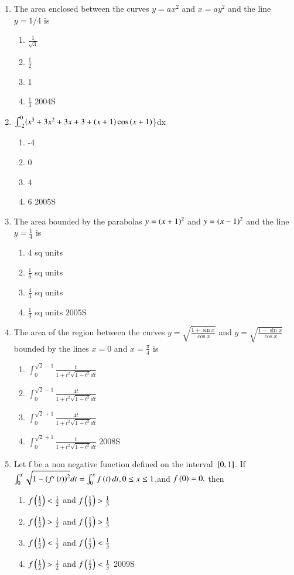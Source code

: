\documentclass[journal,12pt,twocolumn]{IEEEtran}
\theoremstyle{remark}
\begin{document}
\begin{enumerate}
\begin{enumerate}
 \end{enumerate}
 \item The area enclosed between the curves $y=ax^{2}$ and $x=ay^{2}$ and the line $y=1/4$ is
 \begin{enumerate}
	 \item $\frac{1}{\sqrt{3}}$
	 \item $\frac{1}{2}$
     \item 1
     \item $\frac{1}{3}$
     \hfill{{2004S}}
 \end{enumerate}
 \item $\int_{-2}^{0}\{x^{3}+3x^{2}+3x+3+\left(x+1\right)\cos\left(x+1\right)$\}dx
\begin{enumerate}
 \item -4
 \item 0
 \item 4
 \item 6
 \hfill{{2005S}}
\end{enumerate}
  \item The area bounded by the parabolas $y=\left(x+1\right)^2$ and $y=\left(x-1\right)^2$ and the line $y=\frac{1}{4}$ is
\begin{enumerate}
    \item 4 sq units
    \item $\frac{1}{6}$ sq units
    \item $\frac{4}{3}$ sq units
    \item $\frac{1}{3}$ sq units
    \hfill{{2005S}}
\end{enumerate}
 \item The area of the region between the curves $y=\sqrt{\frac{1+\sin x}{\cos x}}$ and $y=\sqrt{\frac{1-\sin x}{\cos x}}$ bounded by the lines $x=0$ and $x=\frac{\pi}{4}$ is
\begin{enumerate}
    \item $\int_{0}^{\sqrt{2}-1}\frac{t}{1+t^{2}\sqrt{1-t^{2}}dt}$
       \item $\int_{0}^{\sqrt{2}-1}\frac{4t}{1+t^{2}\sqrt{1-t^{2}}dt}$
      \item $\int_{0}^{\sqrt{2}+1}\frac{4t}{1+t^{2}\sqrt{1-t^{2}}dt}$ 
         \item $\int_{0}^{\sqrt{2}+1}\frac{t}{1+t^{2}\sqrt{1-t^{2}}dt}$
         \hfill{{2008S}}
\end{enumerate}
\item Let f be a non negative function defined on the interval ${}\left[0,1\right]$. If $\int_{0}^{x}\sqrt{1-\left(f'\left(t\right)\right)^{2}}dt=\int_{0}^{x}f\left(t\right)dt,0\leq{x}\leq1$,and $f\left(0\right)=0,$ then
\begin{enumerate}
    \item$ f\left(\frac{1}{2}\right)<\frac{1}{2}$ and $f\left(\frac{1}{3}\right)>\frac{1}{3}$
    \item$ f\left(\frac{1}{2}\right)>\frac{1}{2}$ and $f\left(\frac{1}{3}\right)>\frac{1}{3}$
  \item$ f\left(\frac{1}{2}\right)<\frac{1}{2}$ and $f\left(\frac{1}{3}\right)<\frac{1}{3}$
  \item$ f\left(\frac{1}{2}\right)>\frac{1}{2}$ and $f\left(\frac{1}{3}\right)<\frac{1}{3}$
  \hfill{{2009S}}
\end{enumerate}
\end{enumerate}
\end{document}
